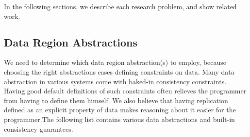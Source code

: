 \documentclass[]{usiinfprospectus}
\begin{document}
In the following sections, we describe each research problem, and show related work.

\subsection{Data Region Abstractions}
We need to determine which data region abstraction(s) to employ, because choosing the right abstractions eases defining constraints on data. Many data abstraction in various systems come with baked-in consistency constraints. Having good default definitions of such constraints often relieves the programmer from having to define them himself. We also believe that having replication defined as an explicit property of data makes reasoning about it easier for the programmer.The following list contains various data abstractions and built-in consistency guarantees. 
\end{document}
